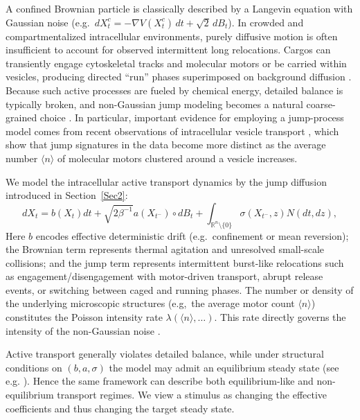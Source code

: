\documentclass[10pt]{article}
\theoremstyle{definition}
\numberwithin{equation}{section}
\begin{document}
A confined Brownian particle is classically described by a Langevin equation with Gaussian noise (e.g.\ $dX_t^c=-\nabla V(X_t^c)\,dt+\sqrt{2}\,dB_t$). 
In crowded and compartmentalized intracellular environments, purely diffusive motion is often insufficient to account for observed intermittent long relocations. 
Cargos can transiently engage cytoskeletal tracks and molecular motors or be carried within vesicles, producing directed ``run'' phases superimposed on background diffusion \cite{vale1985,vale1985b,schroer1989}. 
Because such active processes are fueled by chemical energy, detailed balance is typically broken, and non-Gaussian jump  modeling becomes a natural coarse-grained choice \cite{schliwa1984,stenmark2009}. In particular, important evidence for employing a jump-process model comes from recent observations of intracellular vesicle transport \cite{chen2015}, which show that jump signatures in the data become more distinct as the average number $\langle n\rangle$ of molecular motors clustered around a vesicle increases.

We model the intracellular active transport dynamics by the jump diffusion introduced in Section~\ref{Sec2}:
\begin{equation*}
    dX_t =  b(X_{t})dt +  \sqrt{2\beta^{-1}} a(X_{t^-}) \circ dB_t  +  \int_{\mathbb{R}^n\setminus\{0\}} \sigma(X_{t^{-}},z) N(dt,dz),
\end{equation*}
Here $b$ encodes effective deterministic drift (e.g.\ confinement or mean reversion); the Brownian term represents thermal agitation and unresolved small-scale collisions; and the jump term represents intermittent burst-like relocations such as engagement/disengagement with motor-driven transport, abrupt release events, or switching between caged and running phases. The number or density of the underlying microscopic structures (e.g,\ the average motor count $\langle n\rangle$) constitutes the Poisson intensity rate $\lambda(\langle n\rangle,\dots)$. This rate directly governs the intensity of the non-Gaussian noise \cite{chen2015}.

Active transport generally violates detailed balance, while under structural conditions on $(b,a,\sigma)$ the model may admit an equilibrium steady state (see e.g. \cite{ZL25}). 
Hence the same framework can describe both equilibrium-like and non-equilibrium transport regimes. 
We view a stimulus as changing the effective coefficients and thus changing the target steady state. 
\end{document}
